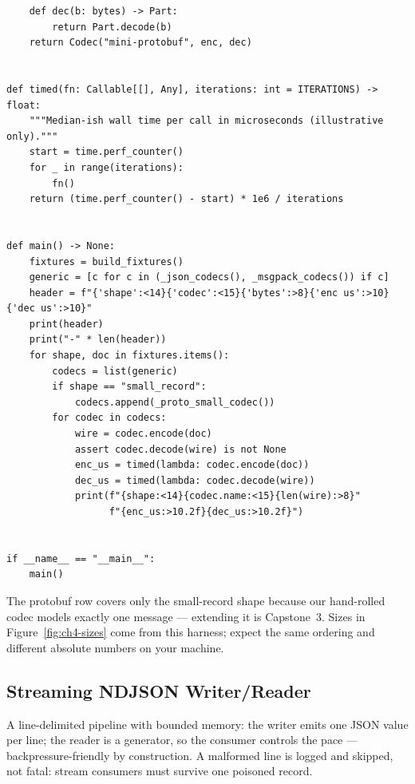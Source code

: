 \begin{verbatim}
    def dec(b: bytes) -> Part:
        return Part.decode(b)
    return Codec("mini-protobuf", enc, dec)


def timed(fn: Callable[[], Any], iterations: int = ITERATIONS) -> float:
    """Median-ish wall time per call in microseconds (illustrative only)."""
    start = time.perf_counter()
    for _ in range(iterations):
        fn()
    return (time.perf_counter() - start) * 1e6 / iterations


def main() -> None:
    fixtures = build_fixtures()
    generic = [c for c in (_json_codecs(), _msgpack_codecs()) if c]
    header = f"{'shape':<14}{'codec':<15}{'bytes':>8}{'enc us':>10}{'dec us':>10}"
    print(header)
    print("-" * len(header))
    for shape, doc in fixtures.items():
        codecs = list(generic)
        if shape == "small_record":
            codecs.append(_proto_small_codec())
        for codec in codecs:
            wire = codec.encode(doc)
            assert codec.decode(wire) is not None
            enc_us = timed(lambda: codec.encode(doc))
            dec_us = timed(lambda: codec.decode(wire))
            print(f"{shape:<14}{codec.name:<15}{len(wire):>8}"
                  f"{enc_us:>10.2f}{dec_us:>10.2f}")


if __name__ == "__main__":
    main()
\end{verbatim}

The protobuf row covers only the small-record shape because our hand-rolled codec
models exactly one message --- extending it is Capstone~3. Sizes in
Figure~\ref{fig:ch4-sizes} come from this harness; expect the same ordering and
different absolute numbers on your machine.

\subsection{Streaming NDJSON Writer/Reader}
\label{sec:ch4-code-ndjson}

A line-delimited pipeline with bounded memory: the writer emits one JSON value per
line; the reader is a generator, so the consumer controls the pace ---
backpressure-friendly by construction. A malformed line is logged and skipped, not
fatal: stream consumers must survive one poisoned record.

